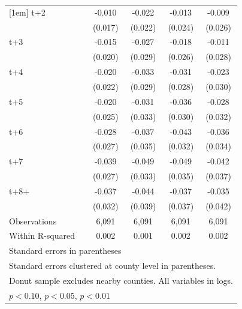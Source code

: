 \begin{table}[htbp]
\begin{tabular}{l*{4}{c}}
[1em]
t+2         &      -0.010         &      -0.022         &      -0.013         &      -0.009         \\
            &     (0.017)         &     (0.022)         &     (0.024)         &     (0.026)         \\
[1em]
t+3         &      -0.015         &      -0.027         &      -0.018         &      -0.011         \\
            &     (0.020)         &     (0.029)         &     (0.026)         &     (0.028)         \\
[1em]
t+4         &      -0.020         &      -0.033         &      -0.031         &      -0.023         \\
            &     (0.022)         &     (0.029)         &     (0.028)         &     (0.030)         \\
[1em]
t+5         &      -0.020         &      -0.031         &      -0.036         &      -0.028         \\
            &     (0.025)         &     (0.033)         &     (0.030)         &     (0.032)         \\
[1em]
t+6         &      -0.028         &      -0.037         &      -0.043         &      -0.036         \\
            &     (0.027)         &     (0.035)         &     (0.032)         &     (0.034)         \\
[1em]
t+7         &      -0.039         &      -0.049         &      -0.049         &      -0.042         \\
            &     (0.027)         &     (0.033)         &     (0.035)         &     (0.037)         \\
[1em]
t+8+        &      -0.037         &      -0.044         &      -0.037         &      -0.035         \\
            &     (0.032)         &     (0.039)         &     (0.037)         &     (0.042)         \\
\hline
Observations&       6,091         &       6,091         &       6,091         &       6,091         \\
Within R-squared&       0.002         &       0.001         &       0.002         &       0.002         \\
\hline\hline
\multicolumn{5}{l}{\footnotesize Standard errors in parentheses}\\
\multicolumn{5}{l}{\footnotesize Standard errors clustered at county level in parentheses.}\\
\multicolumn{5}{l}{\footnotesize Donut sample excludes nearby counties. All variables in logs.}\\
\multicolumn{5}{l}{\footnotesize \sym{*} \(p<0.10\), \sym{**} \(p<0.05\), \sym{***} \(p<0.01\)}\\
\end{tabular}
\end{table}
